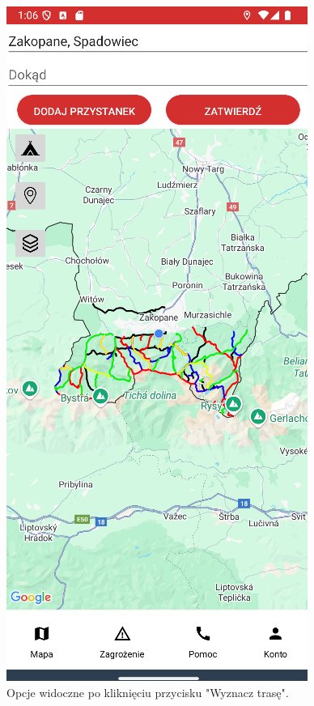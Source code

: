 \begin{figure}[H]
    \centering
    \includegraphics[scale=0.6]{img/imp/widok-loka.png}
    \caption{Opcje widoczne po kliknięciu przycisku "Wyznacz trasę".}
    \label{widok:wyznacztrase}
\end{figure}

